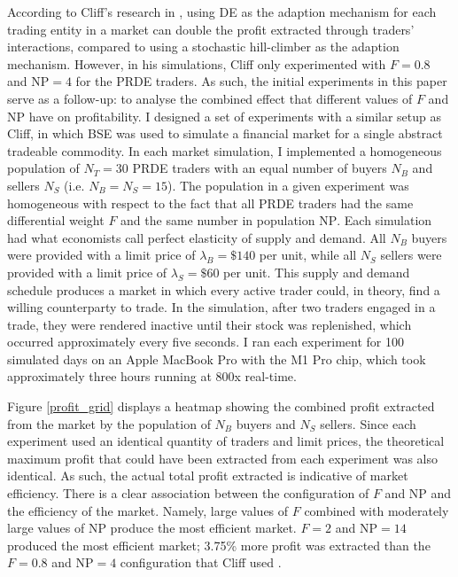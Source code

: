 \documentclass[conference]{IEEEtran}
\begin{document}
According to Cliff's research in \cite{PRDE}, using DE as the adaption mechanism for each trading entity in a market can double the profit extracted through traders' interactions, compared to using a stochastic hill-climber as the adaption mechanism.
However, in his simulations, Cliff only experimented with $F=0.8$ and $\mathrm{NP}=4$ for the PRDE traders.
As such, the initial experiments in this paper serve as a follow-up: to analyse the combined effect that different values of $F$ and $\mathrm{NP}$ have on profitability.
I designed a set of experiments with a similar setup as Cliff, in which BSE was used to simulate a financial market for a single abstract tradeable commodity.
In each market simulation, I implemented a homogeneous population of $N_T=30$ PRDE traders with an equal number of buyers $N_B$ and sellers $N_S$ (i.e. $N_B=N_S=15$).
The population in a given experiment was homogeneous with respect to the fact that all PRDE traders had the same differential weight $F$ and the same number in population $\mathrm{NP}$.
Each simulation had what economists call perfect elasticity of supply and demand.
All $N_B$ buyers were provided with a limit price of $\lambda_B=\$140$ per unit, while all $N_S$ sellers were provided with a limit price of $\lambda_S=\$60$ per unit.
This supply and demand schedule produces a market in which every active trader could, in theory, find a willing counterparty to trade.
In the simulation, after two traders engaged in a trade, they were rendered inactive until their stock was replenished, which occurred approximately every five seconds.
I ran each experiment for 100 simulated days on an Apple MacBook Pro with the M1 Pro chip, which took approximately three hours running at 800x real-time.

Figure \ref{profit_grid} displays a heatmap showing the combined profit extracted from the market by the population of $N_B$ buyers and $N_S$ sellers.
Since each experiment used an identical quantity of traders and limit prices, the theoretical maximum profit that could have been extracted from each experiment was also identical.
As such, the actual total profit extracted is indicative of market efficiency.
There is a clear association between the configuration of $F$ and $\mathrm{NP}$ and the efficiency of the market.
Namely, large values of $F$ combined with moderately large values of $\mathrm{NP}$ produce the most efficient market.
$F=2$ and $\mathrm{NP}=14$ produced the most efficient market; 3.75\% more profit was extracted than the $F=0.8$ and $\mathrm{NP}=4$ configuration that Cliff used \cite{PRDE}.
\end{document}
